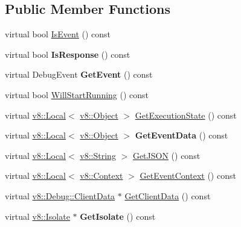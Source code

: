 \subsection*{Public Member Functions}
\begin{DoxyCompactItemize}
\item 
virtual bool \hyperlink{classv8_1_1internal_1_1_message_impl_abea1e06c7076154a2d84570950d3ee5d}{Is\+Event} () const 
\item 
virtual bool {\bfseries Is\+Response} () const \hypertarget{classv8_1_1internal_1_1_message_impl_ad238ccdcd5b57f7ae8a9d606bece6019}{}\label{classv8_1_1internal_1_1_message_impl_ad238ccdcd5b57f7ae8a9d606bece6019}

\item 
virtual Debug\+Event {\bfseries Get\+Event} () const \hypertarget{classv8_1_1internal_1_1_message_impl_a1a49aa8866053f667b1d2e98c124f0d8}{}\label{classv8_1_1internal_1_1_message_impl_a1a49aa8866053f667b1d2e98c124f0d8}

\item 
virtual bool \hyperlink{classv8_1_1internal_1_1_message_impl_a0ab9e3879d700c394048095cfb39caff}{Will\+Start\+Running} () const 
\item 
virtual \hyperlink{classv8_1_1_local}{v8\+::\+Local}$<$ \hyperlink{classv8_1_1_object}{v8\+::\+Object} $>$ \hyperlink{classv8_1_1internal_1_1_message_impl_a4aeebf9757b0e1ec6b45cb4fead43c32}{Get\+Execution\+State} () const 
\item 
virtual \hyperlink{classv8_1_1_local}{v8\+::\+Local}$<$ \hyperlink{classv8_1_1_object}{v8\+::\+Object} $>$ {\bfseries Get\+Event\+Data} () const \hypertarget{classv8_1_1internal_1_1_message_impl_a50712b44310f2884e83a78900e699121}{}\label{classv8_1_1internal_1_1_message_impl_a50712b44310f2884e83a78900e699121}

\item 
virtual \hyperlink{classv8_1_1_local}{v8\+::\+Local}$<$ \hyperlink{classv8_1_1_string}{v8\+::\+String} $>$ \hyperlink{classv8_1_1internal_1_1_message_impl_a1dafde62e876090a237ee0875651a41b}{Get\+J\+S\+ON} () const 
\item 
virtual \hyperlink{classv8_1_1_local}{v8\+::\+Local}$<$ \hyperlink{classv8_1_1_context}{v8\+::\+Context} $>$ \hyperlink{classv8_1_1internal_1_1_message_impl_ad8342e3b8663f9a89e2be154b5ca4e47}{Get\+Event\+Context} () const 
\item 
virtual \hyperlink{classv8_1_1_debug_1_1_client_data}{v8\+::\+Debug\+::\+Client\+Data} $\ast$ \hyperlink{classv8_1_1internal_1_1_message_impl_a6ec7b5784c2c2fbc6159103a8904230a}{Get\+Client\+Data} () const 
\item 
virtual \hyperlink{classv8_1_1_isolate}{v8\+::\+Isolate} $\ast$ {\bfseries Get\+Isolate} () const \hypertarget{classv8_1_1internal_1_1_message_impl_afd44d25359cc8fcbb12a34c3f85cd8f1}{}\label{classv8_1_1internal_1_1_message_impl_afd44d25359cc8fcbb12a34c3f85cd8f1}

\end{DoxyCompactItemize}
